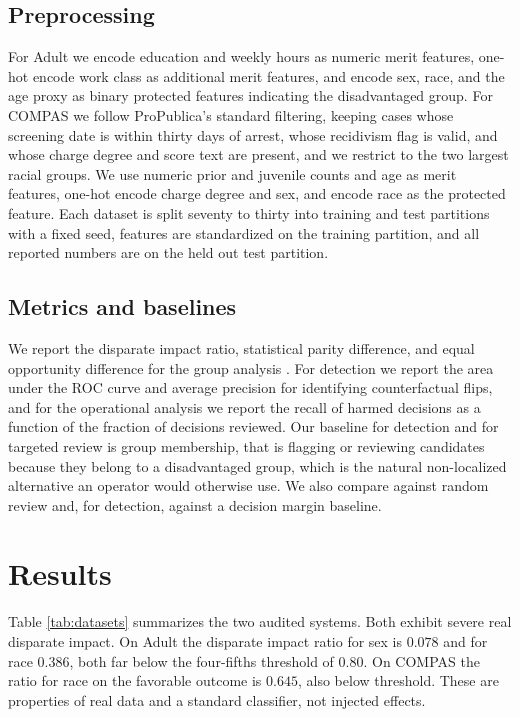 \documentclass[conference]{IEEEtran}
\begin{document}
\subsection{Preprocessing}
For Adult we encode education and weekly hours as numeric merit features, one-hot
encode work class as additional merit features, and encode sex, race, and the age
proxy as binary protected features indicating the disadvantaged group. For COMPAS we
follow ProPublica's standard filtering, keeping cases whose screening date is within
thirty days of arrest, whose recidivism flag is valid, and whose charge degree and
score text are present, and we restrict to the two largest racial groups. We use
numeric prior and juvenile counts and age as merit features, one-hot encode charge
degree and sex, and encode race as the protected feature. Each dataset is split
seventy to thirty into training and test partitions with a fixed seed, features are
standardized on the training partition, and all reported numbers are on the held out
test partition.

\subsection{Metrics and baselines}
We report the disparate impact ratio, statistical parity difference, and equal
opportunity difference for the group analysis \cite{feldman,hardt,uniform}. For
detection we report the area under the ROC curve and average precision for
identifying counterfactual flips, and for the operational analysis we report the
recall of harmed decisions as a function of the fraction of decisions reviewed. Our
baseline for detection and for targeted review is group membership, that is flagging
or reviewing candidates because they belong to a disadvantaged group, which is the
natural non-localized alternative an operator would otherwise use. We also compare
against random review and, for detection, against a decision margin baseline.

\section{Results}
\label{sec:eval}
Table \ref{tab:datasets} summarizes the two audited systems. Both exhibit severe
real disparate impact. On Adult the disparate impact ratio for sex is $0.078$ and for
race $0.386$, both far below the four-fifths threshold of $0.80$. On COMPAS the ratio
for race on the favorable outcome is $0.645$, also below threshold. These are
properties of real data and a standard classifier, not injected effects.
\end{document}
